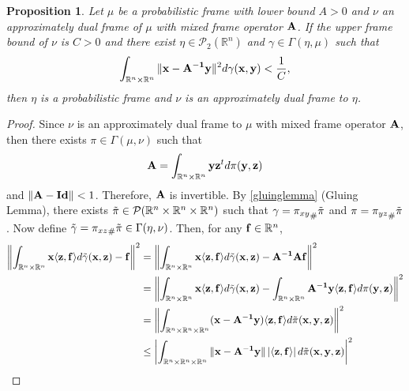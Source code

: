 \documentclass{amsart}
\numberwithin{equation}{section}
\newcommand{\norm}[1]{\left\Vert#1\right\Vert}
\theoremstyle{plain}
\newtheorem{proposition}[theorem]{Proposition}
\theoremstyle{remark}
\theoremstyle{definition}
\begin{document}
 
\begin{proposition}\label{proposition:ApproDualPertubation}
    Let $\mu$ be a probabilistic frame with lower bound $A>0$ and $\nu$ an approximately dual frame of $\mu$ with mixed frame operator $ {\bf A}$.  If the upper frame bound of $\nu$  is $C>0$ 
 and there exist $\eta \in \mathcal{P}_2(\mathbb{R}^n)$ and $\gamma \in \Gamma(\eta, \mu)$ such that 
$$\int_{\mathbb{R}^n \times \mathbb{R}^n} \| {\bf x}-{\bf A^{-1} y} \|^2 d\gamma({\bf x, y}) <  \frac{1}{C},$$
then $\eta $ is a probabilistic frame and $\nu$ is an approximately dual frame to $\eta$.
\end{proposition}
\begin{proof}
    Since $\nu$ is an approximately dual frame to $\mu$ with mixed frame operator $ {\bf A}$, then there exists $\pi \in \Gamma(\mu, \nu)$ such that 
    \begin{equation*}
        {\bf A} = \int_{\mathbb{R}^n \times \mathbb{R}^n} {\bf y}{\bf z}^t d\pi({\bf y, z})
    \end{equation*}
and $\|{\bf A - Id}  \|<1$. Therefore, ${\bf A }$ is invertible. By \cref{gluinglemma} (Gluing Lemma), there exists $\Tilde{\pi} \in \mathcal{P}(\mathbb{R}^n \times \mathbb{R}^n \times \mathbb{R}^n)$ such that $\gamma = {\pi_{xy}}_{\#}{\Tilde{\pi}} $ and $\pi = {\pi_{yz}}_{\#}{\Tilde{\pi}} $. Now define $\Tilde{\gamma} = {\pi_{xz}}_{\#}{\Tilde{\pi}} \in \Gamma(\eta, \nu)$.
Then, for any ${\bf f} \in \mathbb{R}^n$, 
 \begin{equation*}
 \begin{split}
     \norm{\int_{\mathbb{R}^n \times \mathbb{R}^n} {\bf x} \langle {\bf z, f} \rangle d\Tilde{\gamma}({\bf x, z}) - {\bf f}}^2
     &= \norm{\int_{\mathbb{R}^n \times \mathbb{R}^n} {\bf x} \langle {\bf z, f} \rangle d\Tilde{\gamma}({\bf x, z}) - {\bf A^{-1} A f} }^2 \\
      &=  \norm{ \int_{\mathbb{R}^n \times \mathbb{R}^n} {\bf x} \langle {\bf z, f} \rangle  d\Tilde{\gamma}({\bf x, z}) - \int_{\mathbb{R}^n \times \mathbb{R}^n} {\bf A^{-1}} {\bf y} \langle {\bf z, f} \rangle   d\pi({\bf y, z})}^2 \\
      &= \norm{ \int_{\mathbb{R}^n \times \mathbb{R}^n \times \mathbb{R}^n} ({\bf x} - {\bf A^{-1}} {\bf y}) \langle {\bf z, f} \rangle   d\Tilde{\pi}({\bf x, y, z}) }^2 \\
      & \leq \left | \int_{\mathbb{R}^n \times \mathbb{R}^n \times \mathbb{R}^n}  \| {\bf x}-{\bf A^{-1} y} \| \,  | \langle {\bf z, f} \rangle | \,d\Tilde{\pi}({\bf x, y, z}) \right |^2 \\

\end{split}
\end{equation*}
\end{proof}
\end{document}
